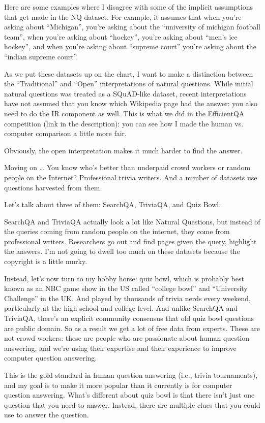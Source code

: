 Here are some examples where I disagree with some of the implicit assumptions that get made in the NQ dataset.  For example, it assumes that when you’re asking about “Michigan”, you’re asking about the “university of michigan football team”, when you’re asking about “hockey”, you’re asking about “men’s ice hockey”, and when you’re asking about “supreme court” you’re asking about the “indian supreme court”.  

As we put these datasets up on the chart, I want to make a distinction between the “Traditional” and “Open” interpretations of natural questions.  While initial natural questions was treated as a SQuAD-like dataset, recent interpretations have not assumed that you know which Wikipedia page had the answer: you also need to do the IR component as well.  This is what we did in the EfficientQA competition (link in the description): you can see how I made the human vs. computer comparison a little more fair.

Obviously, the open interpretation makes it much harder to find the answer.


Moving on … You know who’s better than underpaid crowd workers or random people on the Internet?  Professional trivia writers.  And a number of datasets use questions harvested from them.

Let’s talk about three of them: SearchQA, TriviaQA, and Quiz Bowl.

SearchQA and TriviaQA actually look a lot like Natural Questions, but instead of the queries coming from random people on the internet, they come from professional writers.  Researchers go out and find pages given the query, highlight the answers.  I’m not going to dwell too much on these datasets because the copyright is a little murky.

Instead, let's now turn to my hobby horse: quiz bowl, which is probably best known as an NBC game show in the US called “college bowl” and “University Challenge” in the UK.  And played by thousands of trivia nerds every weekend, particularly at the high school and college level.  And unlike SearchQA and TriviaQA, there’s an explicit community consensus that old quiz bowl questions are public domain.  So as a result we get a lot of free data from experts. These are not crowd workers: these are people who are passionate about human question answering, and we're using their expertise and their experience to improve computer question answering.

This is the gold standard in human question answering (i.e., trivia tournaments), and my goal is to make it more popular than it currently is for computer question answering.  What’s different about quiz bowl is that there isn’t just one question that you need to answer.  Instead, there are multiple clues that you could use to answer the question.  

